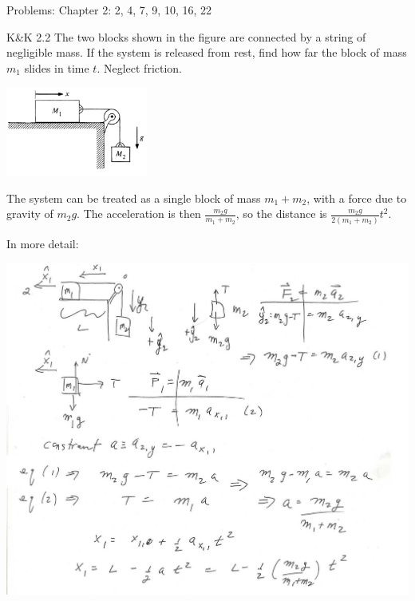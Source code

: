 \documentclass{esg8012pset}
\date{September 17}
\begin{document}
\noindent Problems: Chapter 2: 2, 4, 7, 9, 10, 16, 22

\begin{problem}{K\&K 2.2}
  The two blocks shown in the figure are connected by a string of negligible mass. If the system is released from rest, find how far the block of mass $m_1$ slides in time $t$. Neglect friction.
  \begin{center}\includegraphics[width=0.35\textwidth]{ps02_1}\end{center}
\end{problem}
\begin{solution}
  The system can be treated as a single block of mass $m_1 + m_2$, with a force due to gravity of $m_2 g$.  The acceleration is then $\frac{m_2 g}{m_1 + m_2}$, so the distance is $\frac{m_2 g}{2(m_1 + m_2)} t^2$.
  
  \noindent In more detail:
  \begin{center}\includegraphics[width=\textwidth]{ps02_Solution_Problem_1}\end{center}
\end{solution}
\end{document}
